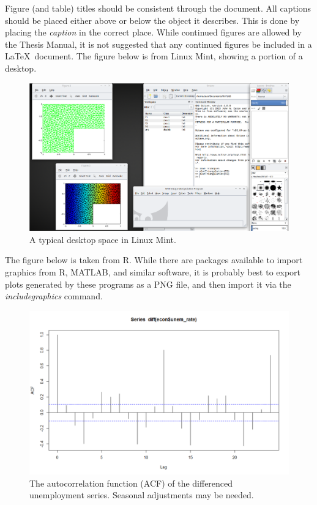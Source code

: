 Figure (and table) titles should be consistent through the document. All captions should be placed either above or below the object it describes. This is done by placing the \textit{caption} in the correct place. While continued figures are allowed by the Thesis Manual, it is not suggested that any continued figures be included in a \LaTeX\ document. The figure below is from Linux Mint, showing a portion of a desktop.

\begin{figure}[H]
	\centering
	\includegraphics[width = 5.75in]{images/Desktop.png}
	\caption{A typical desktop space in Linux Mint.}
\end{figure}

The figure below is taken from R. While there are packages available to import graphics from R, MATLAB, and similar software, it is probably best to export plots generated by these programs as a PNG file, and then import it via the \textit{includegraphics} command.

\begin{figure}[H]
	\centering
	\includegraphics[scale=0.55]{images/UnemDiffACF.png}
	\singlespace
	\caption{The autocorrelation function (ACF) of the differenced unemployment series. Seasonal adjustments may be needed.}
\end{figure}

